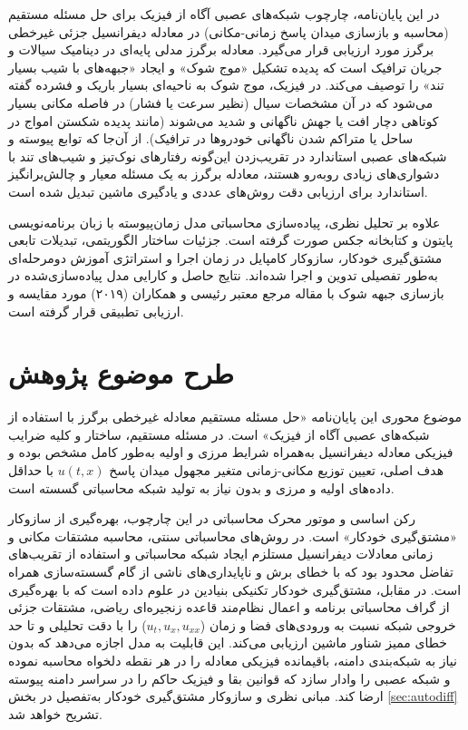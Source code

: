 در این پایان‌نامه، چارچوب شبکه‌های عصبی آگاه از فیزیک برای حل مسئله مستقیم (محاسبه و بازسازی میدان پاسخ زمانی-مکانی) در معادله دیفرانسیل جزئی غیرخطی برگرز مورد ارزیابی قرار می‌گیرد. معادله برگرز مدلی پایه‌ای در دینامیک سیالات و جریان ترافیک است که پدیده تشکیل «موج شوک» و ایجاد «جبهه‌های با شیب بسیار تند» را توصیف می‌کند. در فیزیک، موج شوک به ناحیه‌ای بسیار باریک و فشرده گفته می‌شود که در آن مشخصات سیال (نظیر سرعت یا فشار) در فاصله مکانی بسیار کوتاهی دچار افت یا جهش ناگهانی و شدید می‌شوند (مانند پدیده شکستن امواج در ساحل یا متراکم شدن ناگهانی خودروها در ترافیک). از آن‌جا که توابع پیوسته و شبکه‌های عصبی استاندارد در تقریب‌زدن این‌گونه رفتارهای نوک‌تیز و شیب‌های تند با دشواری‌های زیادی روبه‌رو هستند، معادله برگرز به یک مسئله معیار و چالش‌برانگیز استاندارد برای ارزیابی دقت روش‌های عددی و یادگیری ماشین تبدیل شده است.

علاوه بر تحلیل نظری، پیاده‌سازی محاسباتی مدل زمان‌پیوسته با زبان برنامه‌نویسی پایتون و کتابخانه جکس صورت گرفته است. جزئیات ساختار الگوریتمی، تبدیلات تابعی مشتق‌گیری خودکار، سازوکار کامپایل در زمان اجرا و استراتژی آموزش دومرحله‌ای به‌طور تفصیلی تدوین و اجرا شده‌اند. نتایج حاصل و کارایی مدل پیاده‌سازی‌شده در بازسازی جبهه شوک با مقاله مرجع معتبر رئیسی و همکاران (۲۰۱۹) مورد مقایسه و ارزیابی تطبیقی قرار گرفته است.

\section{طرح موضوع پژوهش}
\label{sec:subject}

موضوع محوری این پایان‌نامه «حل مسئله مستقیم معادله غیرخطی برگرز با استفاده از شبکه‌های عصبی آگاه از فیزیک» است. در مسئله مستقیم، ساختار و کلیه ضرایب فیزیکی معادله دیفرانسیل به‌همراه شرایط مرزی و اولیه به‌طور کامل مشخص بوده و هدف اصلی، تعیین توزیع مکانی-زمانی متغیر مجهول میدان پاسخ $u(t,x)$ با حداقل داده‌های اولیه و مرزی و بدون نیاز به تولید شبکه محاسباتی گسسته است.

رکن اساسی و موتور محرک محاسباتی در این چارچوب، بهره‌گیری از سازوکار «مشتق‌گیری خودکار» است. در روش‌های محاسباتی سنتی، محاسبه مشتقات مکانی و زمانی معادلات دیفرانسیل مستلزم ایجاد شبکه محاسباتی و استفاده از تقریب‌های تفاضل محدود بود که با خطای برش و ناپایداری‌های ناشی از گام گسسته‌سازی همراه است. در مقابل، مشتق‌گیری خودکار تکنیکی بنیادین در علوم داده است که با بهره‌گیری از گراف محاسباتی برنامه و اعمال نظام‌مند قاعده زنجیره‌ای ریاضی، مشتقات جزئی خروجی شبکه نسبت به ورودی‌های فضا و زمان ($u_t, u_x, u_{xx}$) را با دقت تحلیلی و تا حد خطای ممیز شناور ماشین ارزیابی می‌کند. این قابلیت به مدل اجازه می‌دهد که بدون نیاز به شبکه‌بندی دامنه، باقیمانده فیزیکی معادله را در هر نقطه دلخواه محاسبه نموده و شبکه عصبی را وادار سازد که قوانین بقا و فیزیک حاکم را در سراسر دامنه پیوسته ارضا کند. مبانی نظری و سازوکار مشتق‌گیری خودکار به‌تفصیل در بخش \ref{sec:autodiff} تشریح خواهد شد.

